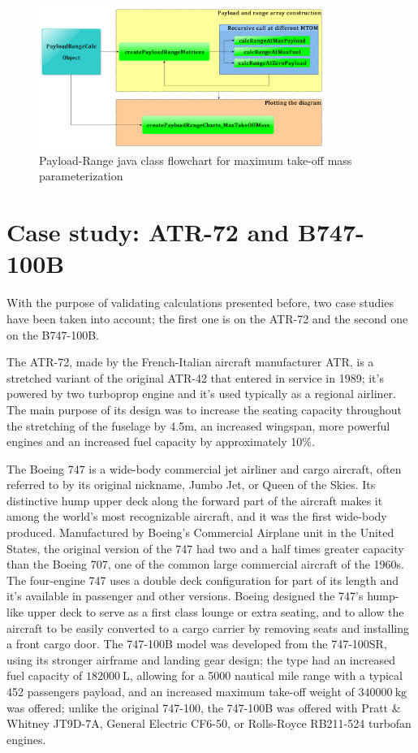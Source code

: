 \documentclass[a4paper,12pt,oneside]{book}
\begin{document}
\bigskip
\begin{figure}[!hb]
\centering
\includegraphics[keepaspectratio, width=0.83\textwidth]{PayloadRange_MTOM_Flowchart}
\caption{Payload-Range java class flowchart for maximum take-off mass parameterization}
\label{fig:Figure4}
\end{figure}

\section{Case study: ATR-72 and B747-100B}
With the purpose of validating calculations presented before, two case studies have been taken into account; the first one is on the ATR-72 and the second one on the B747-100B.

\bigskip
The ATR-72, made by the French-Italian aircraft manufacturer ATR, is a stretched variant of the original ATR-42 that entered in service in 1989; it’s powered by two turboprop engine and it’s used typically as a regional airliner. The main purpose of its design was to increase the seating capacity throughout the stretching of the fuselage by 4.5m, an increased wingspan, more powerful engines and an increased fuel capacity by approximately 10$\%$.

\bigskip
The Boeing 747 is a wide-body commercial jet airliner and cargo aircraft, often referred to by its original nickname, Jumbo Jet, or Queen of the Skies. Its distinctive hump upper deck along the forward part of the aircraft makes it among the world's most recognizable aircraft, and it was the first wide-body produced. Manufactured by Boeing's Commercial Airplane unit in the United States, the original version of the 747 had two and a half times greater capacity than the Boeing 707, one of the common large commercial aircraft of the 1960s. The four-engine 747 uses a double deck configuration for part of its length and it’s available in passenger and other versions. Boeing designed the 747's hump-like upper deck to serve as a first class lounge or extra seating, and to allow the aircraft to be easily converted to a cargo carrier by removing seats and installing a front cargo door. The 747-100B model was developed from the 747-100SR, using its stronger airframe and landing gear design; the type had an increased fuel capacity of $\SI{182000}{\liter}$, allowing for a 5000 nautical mile range with a typical 452 passengers payload, and an increased maximum take-off weight of $\SI{340000}{\kilogram}$ was offered; unlike the original 747-100, the 747-100B was offered with Pratt \& Whitney JT9D-7A, General Electric CF6-50, or Rolls-Royce RB211-524 turbofan engines.
\end{document}
